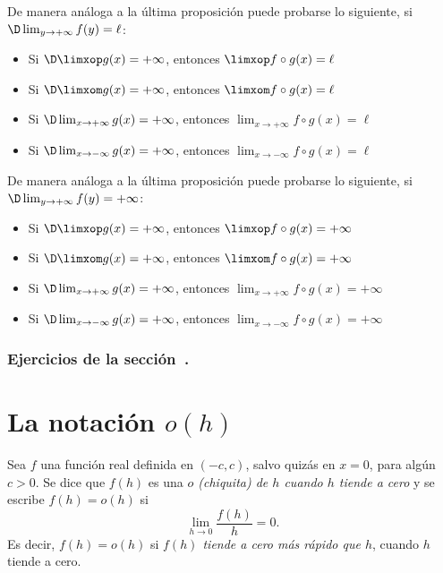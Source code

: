 \begin{corollary}
    De manera análoga a la última proposición puede probarse lo siguiente, si $\D\lim_{y\to+\infty}f(y)=\ell$:
    \begin{itemize}
        \item Si $\D\limxop g(x) = +\infty$, entonces $\limxop f\circ g(x) = \ell$
        \item Si $\D\limxom g(x) = +\infty$, entonces $\limxom f\circ g(x) = \ell$
        \item Si $\D\lim_{x\to +\infty} g(x) = +\infty$, entonces $\lim_{x\to +\infty} f\circ g(x) = \ell$
        \item Si $\D\lim_{x\to -\infty} g(x) = +\infty$, entonces $\lim_{x\to -\infty} f\circ g(x) = \ell$
    \end{itemize}
\end{corollary}

\begin{corollary}
    De manera análoga a la última proposición puede probarse lo siguiente, si $\D\lim_{y\to+\infty}f(y)=+\infty$:
    \begin{itemize}
        \item Si $\D\limxop g(x) = +\infty$, entonces $\limxop f\circ g(x) = +\infty$
        \item Si $\D\limxom g(x) = +\infty$, entonces $\limxom f\circ g(x) = +\infty$
        \item Si $\D\lim_{x\to +\infty} g(x) = +\infty$, entonces $\lim_{x\to +\infty} f\circ g(x) = +\infty$
        \item Si $\D\lim_{x\to -\infty} g(x) = +\infty$, entonces $\lim_{x\to -\infty} f\circ g(x) = +\infty$
    \end{itemize}
\end{corollary}

\subsubsection*{Ejercicios de la sección~.}

\begin{enumerate}

\end{enumerate}


\section{La notación \texorpdfstring{$o(h)$}{o(h)}}

\begin{definition}
    Sea $f$ una función real definida en $(-c,c)$, salvo quizás en $x=0$, para algún $c>0$. Se dice que $f(h)$ es una \emph{$o$ (chiquita) de $h$ cuando $h$ tiende a cero} y se escribe $f(h)=o(h)$ si
    \[
    \lim_{h\to 0} \frac{f(h)}{h} = 0.
    \]
    Es decir, $f(h) = o(h)$ si \emph{$f(h)$ tiende a cero más rápido que $h$}, cuando $h$ tiende a cero.
\end{definition}

